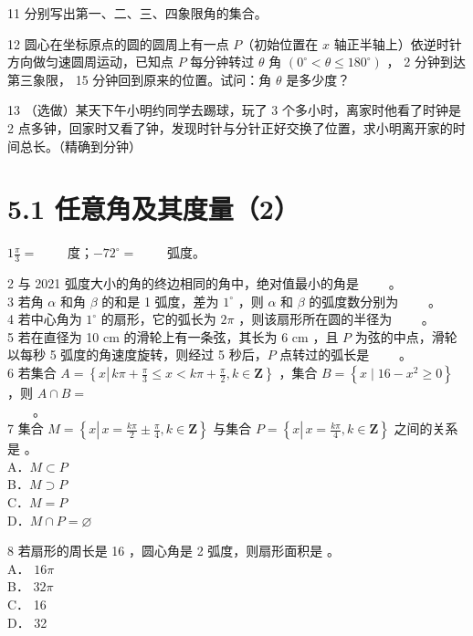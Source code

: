 \documentclass[10pt]{article}
\begin{document}
11 分别写出第一、二、三、四象限角的集合。

12 圆心在坐标原点的圆的圆周上有一点 \(P\)（初始位置在 \(x\) 轴正半轴上）依逆时针方向做匀速圆周运动，已知点 \(P\) 每分钟转过 \(\theta\) 角 \(\left(0^{\circ}<\theta \leqslant 180^{\circ}\right)\) ， 2 分钟到达第三象限， 15 分钟回到原来的位置。试问：角 \(\theta\) 是多少度？

13 （选做）某天下午小明约同学去踢球，玩了 3 个多小时，离家时他看了时钟是 2 点多钟，回家时又看了钟，发现时针与分针正好交换了位置，求小明离开家的时间总长。（精确到分钟）

\section*{5.1 任意角及其度量（2）}
\(1 \frac{\pi}{3}=\) \(\qquad\)度；\(-72^{\circ}=\) \(\qquad\)弧度。

2 与 2021 弧度大小的角的终边相同的角中，绝对值最小的角是 \(\qquad\)。\\
3 若角 \(\alpha\) 和角 \(\beta\) 的和是 1 弧度，差为 \(1^{\circ}\) ，则 \(\alpha\) 和 \(\beta\) 的弧度数分别为 \(\qquad\)。\\
4 若中心角为 \(1^{\circ}\) 的扇形，它的弧长为 \(2 \pi\) ，则该扇形所在圆的半径为 \(\qquad\)。\\
5 若在直径为 10 cm 的滑轮上有一条弦，其长为 6 cm ，且 \(P\) 为弦的中点，滑轮以每秒 5 弧度的角速度旋转，则经过 5 秒后，\(P\) 点转过的弧长是 \(\qquad\)。\\
6 若集合 \(A=\left\{x \left\lvert\, k \pi+\frac{\pi}{3} \leqslant x<k \pi+\frac{\pi}{2}\right., k \in \mathbf{Z}\right\}\) ，集合 \(B=\left\{x \mid 16-x^{2} \geqslant 0\right\}\) ，则 \(A \cap B=\)\\
\(\qquad\)。\\
7 集合 \(M=\left\{x \left\lvert\, x=\frac{k \pi}{2} \pm \frac{\pi}{4}\right., k \in \mathbf{Z}\right\}\) 与集合 \(P=\left\{x \left\lvert\, x=\frac{k \pi}{4}\right., k \in \mathbf{Z}\right\}\) 之间的关系是 。\\
A．\(M \subset P\)\\
B．\(M \supset P\)\\
C．\(M=P\)\\
D．\(M \cap P=\varnothing\)

8 若扇形的周长是 16 ，圆心角是 2 弧度，则扇形面积是 。\\
A． \(16 \pi\)\\
B． \(32 \pi\)\\
C． 16\\
D． 32
\end{document}
